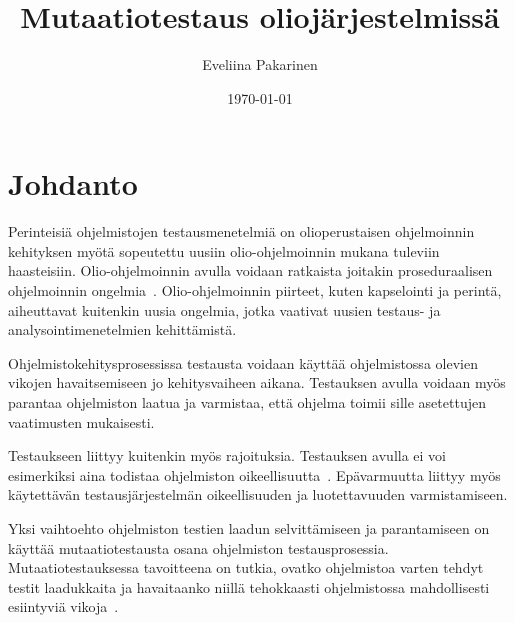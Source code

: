 \documentclass[finnish, grading]{tktltiki2}
\title{Mutaatiotestaus oliojärjestelmissä}
\author{Eveliina Pakarinen}
\date{\today}
\theoremstyle{definition}
\theoremstyle{remark}
\begin{document}

\frontmatter      %

\maketitle        %
\makeabstract     %

\tableofcontents  %


\mainmatter       %




\section{Johdanto}

Perinteisiä ohjelmistojen testausmenetelmiä on olioperustaisen ohjelmoinnin kehityksen myötä sopeutettu uusiin olio-ohjelmoinnin mukana tuleviin haasteisiin. Olio-ohjelmoinnin avulla voidaan ratkaista joitakin proseduraalisen ohjelmoinnin ongelmia~\cite[s. 86]{Mariani:Pezze:2008}. O\-li\-o-oh\-jel\-moin\-nin piirteet, kuten kapselointi ja perintä, aiheuttavat kuitenkin uusia ongelmia, jotka vaativat uusien testaus- ja analysointimenetelmien kehittämistä.

Ohjelmistokehitysprosessissa testausta voidaan käyttää ohjelmistossa olevien vikojen havaitsemiseen jo kehitysvaiheen aikana. Testauksen avulla voidaan myös parantaa ohjelmiston laatua ja varmistaa, että ohjelma toimii sille asetettujen vaatimusten mukaisesti. 

Testaukseen liittyy kuitenkin myös rajoituksia. Testauksen avulla ei voi esimerkiksi aina todistaa ohjelmiston oikeellisuutta~\cite[s. 58]{Binder:1999}. Epävarmuutta liittyy myös käytettävän testausjärjestelmän oikeellisuuden ja luotettavuuden varmistamiseen.

Yksi vaihtoehto ohjelmiston testien laadun selvittämiseen ja parantamiseen on käyttää mutaatiotestausta osana ohjelmiston testausprosessia. Mutaatiotestauksessa tavoitteena on tutkia, ovatko ohjelmistoa varten tehdyt testit laadukkaita ja havaitaanko niillä tehokkaasti ohjelmistossa mahdollisesti esiintyviä vikoja~\cite[s. 649]{Jia:Harman:2011}. 
\end{document}

